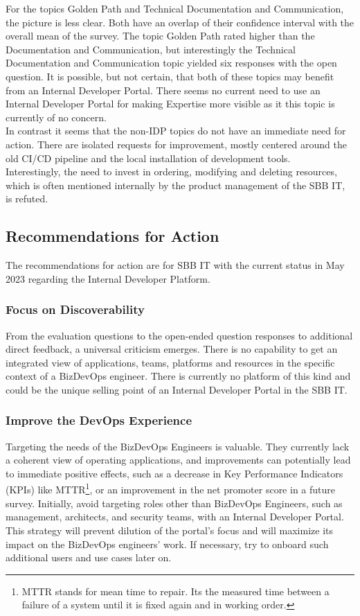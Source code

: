 \documentclass[a4paper,10pt]{article}
\begin{document}
    For the topics Golden Path and Technical Documentation and Communication, the picture is less clear.
    Both have an overlap of their confidence interval with the overall mean of the survey.
    The topic Golden Path rated higher than the Documentation and Communication, but interestingly the Technical Documentation and
    Communication topic yielded six responses with the open question.
    It is possible, but not certain, that both of these topics may benefit from an Internal Developer Portal.
    There seems no current need to use an Internal Developer Portal for making Expertise more visible as it this topic is
    currently of no concern.\\
    In contrast it seems that the non-IDP topics do not have an immediate need for action.
    There are isolated requests for improvement, mostly centered around the old CI/CD pipeline and the local installation
    of development tools.\\
    Interestingly, the need to invest in ordering, modifying and deleting resources,
    which is often mentioned internally by the product management of the SBB IT, is refuted.

    \subsection{Recommendations for Action}
    \label{subsec:arec}
    The recommendations for action are for SBB IT with the current status in May 2023 regarding the Internal Developer Platform.

    \subsubsection{Focus on Discoverability}
    From the evaluation questions to the open-ended question responses to additional direct feedback, a universal criticism emerges.
    There is no capability to get an integrated view of applications, teams, platforms and resources in the specific context of a BizDevOps engineer.
    There is currently no platform of this kind and could be the unique selling point of an Internal Developer Portal in the SBB IT.

    \subsubsection{Improve the DevOps Experience}
    Targeting the needs of the BizDevOps Engineers is valuable.
    They currently lack a coherent view of operating applications, and improvements can potentially lead to immediate
    positive effects, such as a decrease in Key Performance Indicators (KPIs) like MTTR\footnote{MTTR stands for mean time to repair. Its the measured time between a failure of a system
    until it is fixed again and in working order.}, or an improvement in the
    net promoter score in a future survey.
    Initially, avoid targeting roles other than BizDevOps Engineers, such as management, architects, and security teams,
    with an Internal Developer Portal.
    This strategy will prevent dilution of the portal's focus and will maximize its impact on the BizDevOps engineers' work.
    If necessary, try to onboard such additional users and use cases later on.
\end{document}
